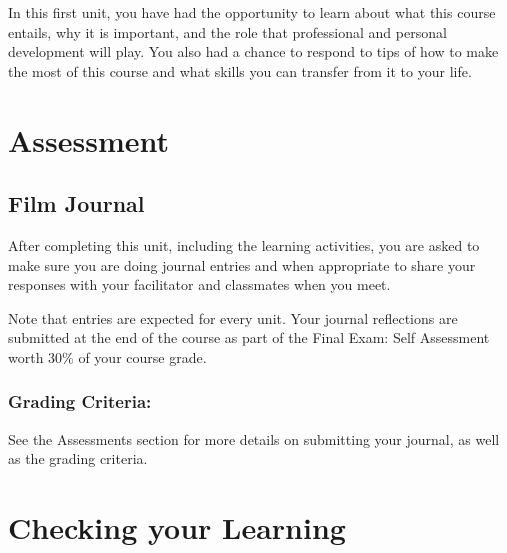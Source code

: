 \documentclass[
]{book}
\begin{document}
In this first unit, you have had the opportunity to learn about what this course entails, why it is important, and the role that professional and personal development will play. You also had a chance to respond to tips of how to make the most of this course and what skills you can transfer from it to your life.

\hypertarget{assessment-1}{%
\section*{Assessment}\label{assessment-1}}

\begin{assessment}
\hypertarget{film-journal}{%
\subsection*{Film Journal}\label{film-journal}}

After completing this unit, including the learning activities, you are asked to make sure you are doing journal entries and when appropriate to share your responses with your facilitator and classmates when you meet.

Note that entries are expected for every unit. Your journal reflections are submitted at the end of the course as part of the Final Exam: Self Assessment worth 30\% of your course grade.

\hypertarget{grading-criteria}{%
\subsubsection*{Grading Criteria:}\label{grading-criteria}}

See the Assessments section for more details on submitting your journal, as well as the grading criteria.
\end{assessment}

\hypertarget{checking-your-learning}{%
\section*{Checking your Learning}\label{checking-your-learning}}
\end{document}
